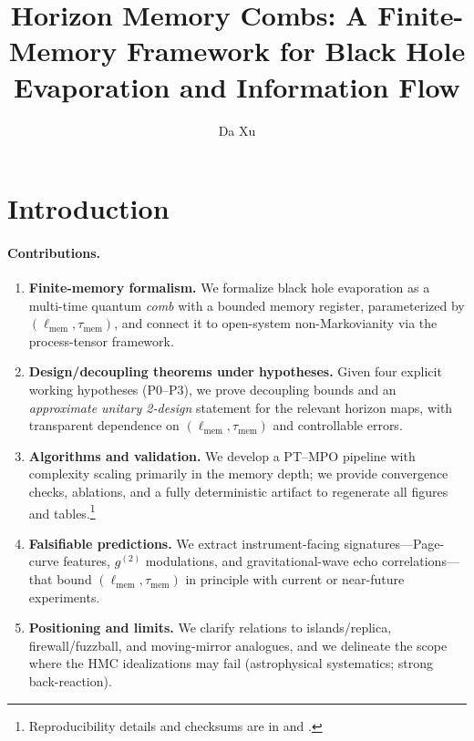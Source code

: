 \documentclass[a4paper,11pt]{article}
\title{Horizon Memory Combs: A Finite-Memory Framework for Black Hole Evaporation and Information Flow}
\author{Da Xu}
\affiliation{China Mobile Research Institute,\\
Beijing, P. R. China}
\newcommand{\HMC}{\textsc{HMC}\xspace}
\newcommand{\ellmem}{\ensuremath{\ell_{\mathrm{mem}}}}
\newcommand{\taumem}{\ensuremath{\tau_{\mathrm{mem}}}}
\theoremstyle{plain}
\theoremstyle{definition}
\theoremstyle{remark}
\begin{document}
\maketitle

\flushbottom


\section{Introduction}
\label{sec:intro}

\paragraph{Contributions.}
\begin{enumerate}[leftmargin=*,itemsep=0.3em]
  \item \textbf{Finite-memory formalism.} We formalize black hole evaporation as a multi-time quantum \emph{comb} with a bounded memory register, parameterized by $(\ellmem,\taumem)$, and connect it to open-system non-Markovianity via the process-tensor framework.
  \item \textbf{Design/decoupling theorems under hypotheses.} Given four explicit working hypotheses (P0--P3), we prove decoupling bounds and an \emph{approximate unitary 2-design} statement for the relevant horizon maps, with transparent dependence on $(\ellmem,\taumem)$ and controllable errors.
  \item \textbf{Algorithms and validation.} We develop a PT--MPO pipeline with complexity scaling primarily in the memory depth; we provide convergence checks, ablations, and a fully deterministic artifact to regenerate all figures and tables.\footnote{Reproducibility details and checksums are in  and .}
  \item \textbf{Falsifiable predictions.} We extract instrument-facing signatures---Page-curve features, $g^{(2)}$ modulations, and gravitational-wave echo correlations---that bound $(\ellmem,\taumem)$ in principle with current or near-future experiments.
  \item \textbf{Positioning and limits.} We clarify relations to islands/replica, firewall/fuzzball, and moving-mirror analogues, and we delineate the scope where the \HMC{} idealizations may fail (astrophysical systematics; strong back-reaction).
\end{enumerate}
\end{document}
